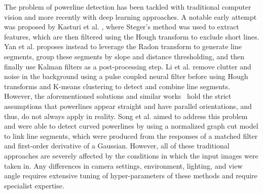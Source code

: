 \documentclass[journal]{IEEEtran}
\begin{document}
The problem of powerline detection has been tackled with traditional computer vision and more recently with deep learning approaches. 
A notable early attempt was proposed by Kasturi et al. \cite{related_work_kasturi_2002}, where Steger's method \cite{related_work_steger_1998} was used to extract features, which are then filtered using the Hough transform to exclude short lines. Yan et al. \cite{related_work_guanjian_yan_2007} proposes instead to leverage the Radon transform to generate line segments, group these segments by slope and distance thresholding, and then finally use Kalman filters as a post-processing step. Li et al. \cite{related_work_li_zhenrong_2010} remove clutter and noise in the background using a pulse coupled neural filter before using Hough transforms and K-means clustering to detect and combine line segments. However, the aforementioned solutions and similar works~\cite{related_work_candamo_2009, related_work_golightly_2005, related_work_zhengrong_li_2008, related_work_boris_alpatov_2016} hold the strict assumptions that powerlines appear straight and have parallel orientations, and thus, do not always apply in reality. Song et al. \cite{related_work_biqin_song_2014} aimed to address this problem and were able to detect curved powerlines by using a normalized graph cut model to link line segments, which were produced from the responses of a matched filter and first-order derivative of a Gaussian. However, all of these traditional approaches are severely affected by the conditions in which the input images were taken in. Any differences in camera settings, environment, lighting, and view angle requires extensive tuning of hyper-parameters of these methods and require specialist expertise.
\end{document}
